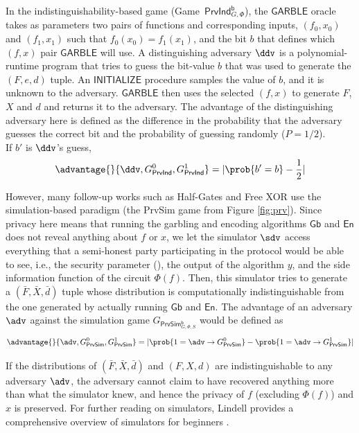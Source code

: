 

In the indistinguishability-based game (Game\ $\mathsf{PrvInd^b_\mathit{G,\Phi}}$), the $\mathsf{GARBLE}$ oracle takes as parameters two pairs of functions and corresponding inputs, $(f_0,x_0)$ and $(f_1,x_1)$ such that $f_0(x_0)=f_1(x_1)$, and the bit $b$ that defines which $(f,x)$ pair $\mathsf{GARBLE}$ will use. A distinguishing adversary $\ddv$ is a polynomial-runtime program that tries to guess the bit-value $b$ that was used to generate the $(F,e,d)$ tuple. 
An $\mathsf{INITIALIZE}$ procedure samples the value of $b$, and it is unknown to the adversary. $\mathsf{GARBLE}$ then uses the selected $(f,x)$ to generate $F$, $X$ and $d$ and returns it to the adversary.
The advantage of the distinguishing adversary here is defined as the difference in the probability that the adversary guesses the correct bit and the probability of guessing randomly ($P=1/2$). \\
If $b'$ is $\ddv$'s guess, 
\[ \advantage{}{\ddv, G^0_{\mathsf{PrvInd}}, G^1_{\mathsf{PrvInd}}} = \lvert \prob{b'=b} - \frac{1}{2} \rvert\]

However, many follow-up works such as Half-Gates \cite{EC:ZahRosEva15} and Free XOR \cite{ALP:KolSch08,JC:Applebaum16} use the simulation-based paradigm (the PrvSim game from Figure \ref{fig:prv}).
Since privacy here means that running the garbling and encoding algorithms $\mathsf{Gb}$ and $\mathsf{En}$ does not reveal anything about $f$ or $x$, we let the simulator $\sdv$ access everything that a semi-honest party participating in the protocol would be able to see, i.e., the security parameter (\secparam), the output of the algorithm $y$, and the side information function of the circuit $\Phi(f)$. Then, this simulator tries to generate a $(\bar{F},\bar{X},\bar{d})$ tuple whose distribution is computationally indistinguishable from the one generated by actually running $\mathsf{Gb}$ and $\mathsf{En}$. The advantage of an adversary $\adv$ against the simulation game $G_{\mathsf{PrvSim^b_\mathit{G,\Phi,S}}}$ would be defined as 
\[ \advantage{}{\adv, G^0_{\mathsf{PrvSim}}, G^1_{\mathsf{PrvSim}}} = \lvert \prob{1 = \adv \to G^0_{\mathsf{PrvSim}}} - \prob{1 = \adv \to G^1_{\mathsf{PrvSim}}} \rvert\]

If the distributions of $(\bar{F},\bar{X},\bar{d})$ and $(F,X,d)$ are indistinguishable to any adversary $\adv$, the adversary cannot claim to have recovered anything more than what the simulator knew, and hence the privacy of $f$ (excluding $\Phi(f)$) and $x$ is preserved. For further reading on simulators, Lindell provides a comprehensive overview of simulators for beginners \cite{lindell_how_2017}. 

